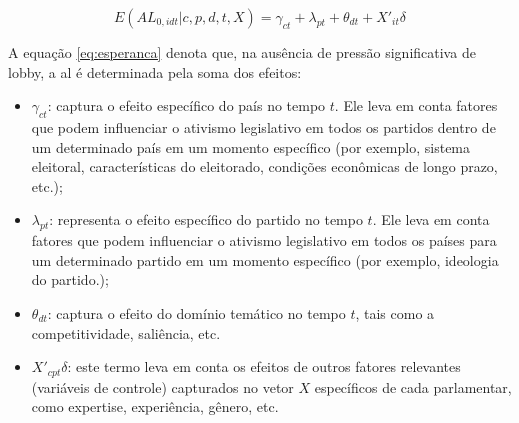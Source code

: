\begin{equation}
    \label{eq:esperanca}
    E(AL_{0,idt} \vert c,p,d,t,X) = \gamma_{ct} + \lambda_{pt} + \theta_{dt} + X'_{it} \delta
\end{equation}

A equação \ref{eq:esperanca} denota que, na ausência de pressão significativa de lobby, a \acrshort{al} é determinada pela soma dos efeitos:
\begin{itemize}
    \item $\gamma_{ct}$: captura o efeito específico do país no tempo $t$. Ele leva em conta fatores que podem influenciar o ativismo legislativo em todos os partidos dentro de um determinado país em um momento específico (por exemplo, sistema eleitoral, características do eleitorado, condições econômicas de longo prazo, etc.);
    \item $\lambda_{pt}$: representa o efeito específico do partido no tempo $t$. Ele leva em conta fatores que podem influenciar o ativismo legislativo em todos os países para um determinado partido em um momento específico (por exemplo, ideologia do partido.);
    \item $\theta_{dt}$: captura o efeito do domínio temático no tempo $t$, tais como a competitividade, saliência, etc.
    \item $X'_{cpt} \delta$: este termo leva em conta os efeitos de outros fatores relevantes (variáveis de controle) capturados no vetor $X$ específicos de cada parlamentar, como expertise, experiência, gênero, etc.
\end{itemize}





